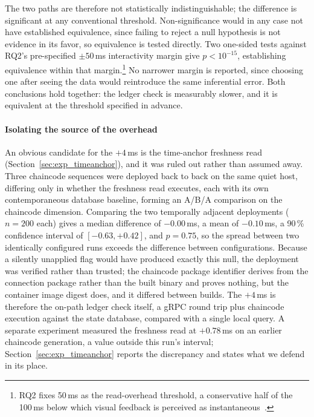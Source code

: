 \documentclass[preprint,12pt]{elsarticle}
\begin{document}
The two paths are therefore not statistically indistinguishable; the
difference is significant at any conventional threshold. Non-significance would
in any case not have established equivalence, since failing to reject a null
hypothesis is not evidence in its favor, so equivalence is tested directly. Two
one-sided tests against RQ2's pre-specified $\pm 50$\,ms interactivity margin
give $p < 10^{-15}$, establishing equivalence within that
margin.\footnote{RQ2 fixes 50\,ms as the read-overhead threshold, a
conservative half of the 100\,ms below which visual feedback is perceived as
instantaneous~\cite{nielsen1993usability}.} No narrower margin is reported,
since choosing one after seeing the data would reintroduce the same inferential
error. Both conclusions hold together: the ledger check is measurably slower,
and it is equivalent at the threshold specified in advance.

\paragraph{Isolating the source of the overhead}
An obvious candidate for the $+4$\,ms is the time-anchor freshness read
(Section~\ref{sec:exp_timeanchor}), and it was ruled out rather than assumed
away. Three chaincode sequences were deployed back to back on the same quiet
host, differing only in whether the freshness read executes, each with its own
contemporaneous database baseline, forming an A/B/A comparison on the chaincode
dimension. Comparing the two temporally adjacent deployments ($n = 200$ each)
gives a median difference of $-0.00$\,ms, a mean of $-0.10$\,ms, a 90\,\%
confidence interval of $[-0.63, +0.42]$, and $p = 0.75$, so the spread between
two identically configured runs exceeds the difference between configurations.
Because a silently unapplied flag would have produced exactly this null, the
deployment was verified rather than trusted; the chaincode package identifier
derives from the connection package rather than the built binary and proves
nothing, but the container image digest does, and it differed between builds.
The $+4$\,ms is therefore the on-path ledger check itself, a gRPC round trip
plus chaincode execution against the state database, compared with a single
local query. A separate experiment measured the freshness read at $+0.78$\,ms
on an earlier chaincode generation, a value outside this run's interval;
Section~\ref{sec:exp_timeanchor} reports the discrepancy and states what we
defend in its place.
\end{document}
